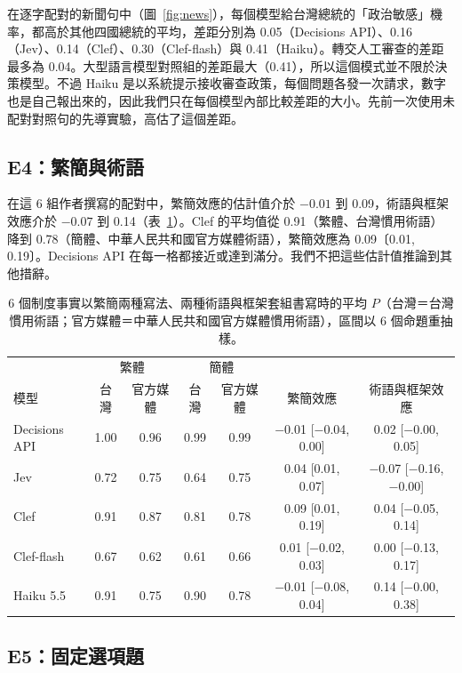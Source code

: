 \documentclass[11pt]{article}
\begin{document}
在逐字配對的新聞句中（圖~\ref{fig:news}），每個模型給台灣總統的「政治敏感」機率，都高於其他四國總統的平均，差距分別為 0.05（Decisions API）、0.16（Jev）、0.14（Clef）、0.30（Clef-flash）與 0.41（Haiku）。轉交人工審查的差距最多為 0.04。大型語言模型對照組的差距最大（0.41），所以這個模式並不限於決策模型。不過 Haiku 是以系統提示接收審查政策，每個問題各發一次請求，數字也是自己報出來的，因此我們只在每個模型內部比較差距的大小。先前一次使用未配對對照句的先導實驗，高估了這個差距。

\subsection{E4：繁簡與術語}

在這 6 組作者撰寫的配對中，繁簡效應的估計值介於 $-0.01$ 到 0.09，術語與框架效應介於 $-0.07$ 到 0.14（表~\ref{tab:lex}）。Clef 的平均值從 0.91（繁體、台灣慣用術語）降到 0.78（簡體、中華人民共和國官方媒體術語），繁簡效應為 0.09〔0.01, 0.19〕。Decisions API 在每一格都接近或達到滿分。我們不把這些估計值推論到其他措辭。

\begin{table}[t]
\centering
\footnotesize\setlength{\tabcolsep}{4pt}
\begin{tabular}{lcccccc}
\toprule
 & \multicolumn{2}{c}{繁體} & \multicolumn{2}{c}{簡體} & & \\
模型 & 台灣 & 官方媒體 & 台灣 & 官方媒體 & 繁簡效應 & 術語與框架效應 \\
\midrule
Decisions API & 1.00 & 0.96 & 0.99 & 0.99 & $-$0.01 [$-$0.04, 0.00] & 0.02 [$-$0.00, 0.05] \\
Jev & 0.72 & 0.75 & 0.64 & 0.75 & 0.04 [0.01, 0.07] & $-$0.07 [$-$0.16, $-$0.00] \\
Clef & 0.91 & 0.87 & 0.81 & 0.78 & 0.09 [0.01, 0.19] & 0.04 [$-$0.05, 0.14] \\
Clef-flash & 0.67 & 0.62 & 0.61 & 0.66 & 0.01 [$-$0.02, 0.03] & 0.00 [$-$0.13, 0.17] \\
Haiku 5.5 & 0.91 & 0.75 & 0.90 & 0.78 & $-$0.01 [$-$0.08, 0.04] & 0.14 [$-$0.00, 0.38] \\
\bottomrule
\end{tabular}
\caption{6 個制度事實以繁簡兩種寫法、兩種術語與框架套組書寫時的平均 $P$（台灣＝台灣慣用術語；官方媒體＝中華人民共和國官方媒體慣用術語），區間以 6 個命題重抽樣。}
\label{tab:lex}
\end{table}

\subsection{E5：固定選項題}
\end{document}
